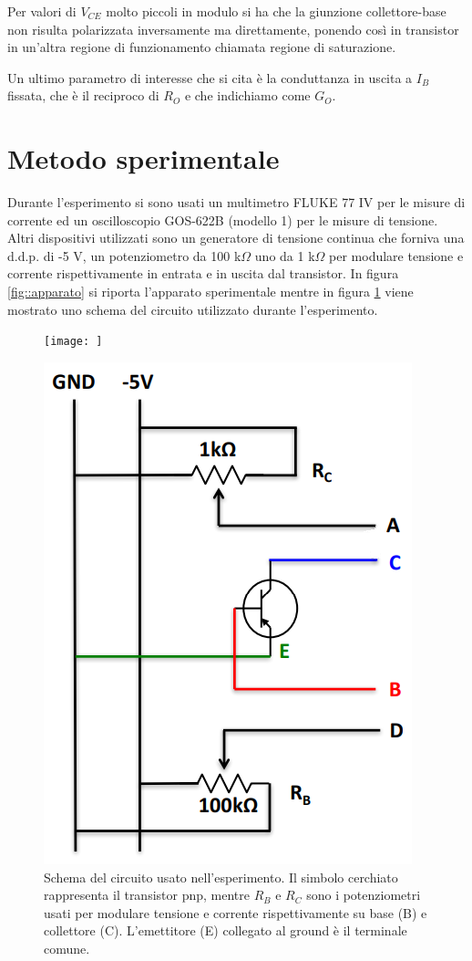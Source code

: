 \documentclass[a4paper,11pt]{article}
\begin{document}
Per valori di $V_{CE}$ molto piccoli in modulo si ha che la giunzione collettore-base non risulta polarizzata inversamente ma direttamente, ponendo così in transistor in un'altra regione di funzionamento chiamata regione di saturazione.

Un ultimo parametro di interesse che si cita è la conduttanza in uscita a $I_B$ fissata, che è il reciproco di $R_O$ e che indichiamo come $G_O$.


\section{Metodo sperimentale}

Durante l'esperimento si sono usati un multimetro FLUKE 77 IV per le misure di corrente ed un oscilloscopio GOS-622B (modello 1) per le misure di tensione. Altri dispositivi utilizzati sono un generatore di tensione continua che forniva una d.d.p. di -5 V, un potenziometro da 100 k$\Omega$ uno da 1 k$\Omega$ per modulare tensione e corrente rispettivamente in entrata e in uscita dal transistor. In figura \ref{fig::apparato} si riporta l'apparato sperimentale mentre in figura \ref{fig::circuito} viene mostrato uno schema del circuito utilizzato durante l'esperimento.

\begin{figure}
    \centering
    \begin{minipage}{0.49\textwidth}
        \texttt{[image: ]}
        \caption{}
        \label{fig::apparato}
    \end{minipage}
    \hfill
    \begin{minipage}{0.49\textwidth}
        \includegraphics[width=0.6\linewidth]{pictures/circuito.png}
        \centering
        \caption{Schema del circuito usato nell'esperimento. Il simbolo cerchiato rappresenta il transistor pnp, mentre $R_B$ e $R_C$ sono i potenziometri usati per modulare tensione e corrente rispettivamente su base (B) e collettore (C). L'emettitore (E) collegato al ground è il terminale comune.}
        \label{fig::circuito}
    \end{minipage}
\end{figure}
\end{document}
